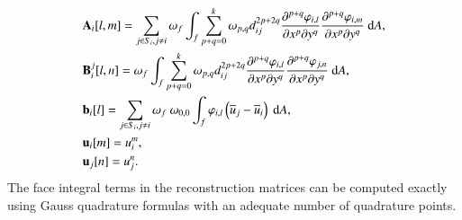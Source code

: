 {\begin{equation}
    \label{eq:vrCoeffs}
    \begin{aligned}
         & \mathbf{A}_{i} [l,m]= \sum_{j \in S_i, j \neq i} \omega_{f} 
           \int_{f}{
             \sum_{p+q=0}^{k} \omega_{p,q} d^{2p+2q}_{ij}
            \partialderivative{^{p+q}\varphi_{i,l}}{x^p\partial y^q}
            \partialderivative{^{p+q}\varphi_{i,m}}{x^p\partial y^q}
            \ \dd A},
        \\
         & \mathbf{B}^j_{i} [l,n]=
        \omega_f \int_{f}{
            \sum_{p+q=0}^{k}
            \omega_{p,q} d^{2p+2q}_{ij}
            \partialderivative{^{p+q}\varphi_{i,l}}{x^p\partial y^q}
            \partialderivative{^{p+q}\varphi_{j,n}}{x^p\partial y^q}
            \ \dd A},
        \\
         & \mathbf{b}_{i} [l]=
        \sum_{j \in S_i, j \neq i}
        \omega_f \ \omega_{0,0}
        \int_{f}{
            \varphi_{i,l} \left(\overline{u}_j - \overline{u}_i\right)
            \ \dd A},
        \\
         & \mathbf{u}_i [m]= u^m_i, \\
             & \mathbf{u}_j [n]= u^n_j.
    \end{aligned}
\end{equation}
The face integral terms in the reconstruction matrices can be computed exactly using Gauss quadrature formulas with an adequate number of quadrature points.
}
